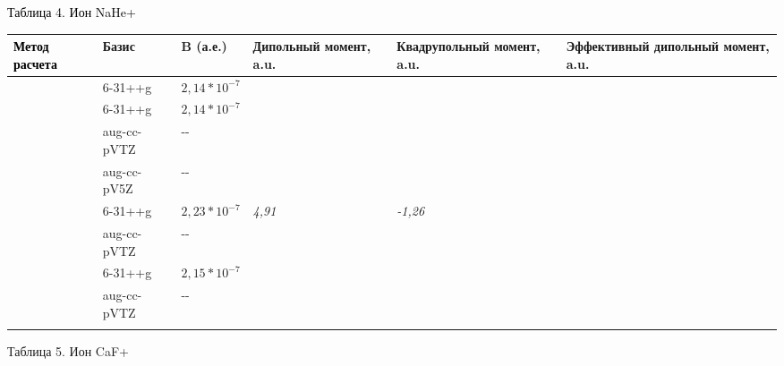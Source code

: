 {\centering
\textcolor{black}{Таблица 4. Ион NaHe+}
\par}


\bigskip

\begin{flushleft}
\tablefirsthead{}
\tablehead{}
\tabletail{}
\tablelasttail{}
\begin{supertabular}{|m{1.8989999cm}|m{2.476cm}|m{2.2979999cm}|m{2.294cm}|m{2.917cm}|m{3.2849998cm}|}
\hline
\textbf{\textcolor{black}{Метод расчета}} &
\textbf{{Базис}} &
\textbf{{B (а.е.)}} &
\textbf{{Дипольный
момент, a.u.}} &
\textbf{{Квадрупольный
момент, a.u.}} &
\textbf{{Эффективный
дипольный момент,
a.u.}}\\\hline
{} &
{6-31++g} &
\raggedleft  $2,14\ast 10^{-7}$ &
 &
 &
\raggedleft{}\\\hline
{} &
{6-31++g} &
\raggedleft  $2,14\ast 10^{-7}$ &
 &
 &
\raggedleft{}\\\hline
 &
{aug-cc-pVTZ} &
{{}-{}-} &
~
 &
~
 &
~
\\\hhline{~-----}
 &
{aug-cc-pV5Z} &
{{}-{}-} &
~
 &
~
 &
~
\\\hline
{} &
{6-31++g} &
\raggedleft  $2,23\ast 10^{-7}$ &
\raggedleft \textit{{4,91}} &
\raggedleft \textit{{{}-1,26}} &
\raggedleft{}\\\hline
 &
{aug-cc-pVTZ} &
{{}-{}-} &
~
 &
~
 &
~
\\\hline
{} &
{6-31++g} &
\raggedleft  $2,15\ast 10^{-7}$ &
 &
 &
\raggedleft{}\\\hline
 &
{aug-cc-pVTZ} &
{{}-{}-} &
~
 &
~
 &
~
\\\hhline{------}
\end{supertabular}
\end{flushleft}
{\centering
{Таблица 5. Ион
}\foreignlanguage{english}{{CaF}}{+}
\par}

